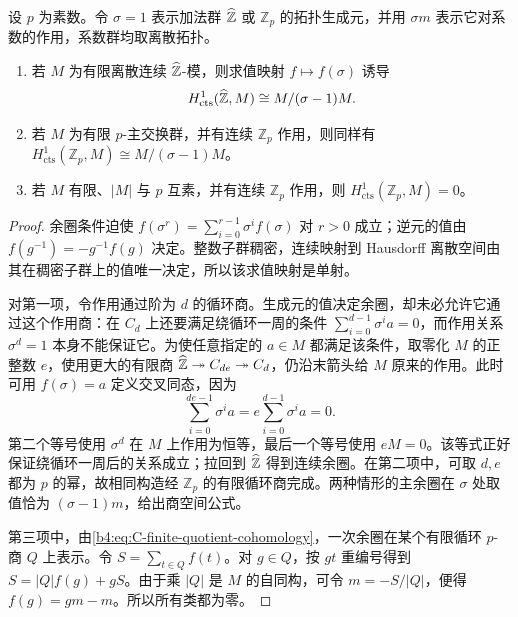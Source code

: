 \begin{proposition}\label{b4:prop:C-procyclic-h1}
	设 \(p\) 为素数。令 \(\sigma=1\) 表示加法群 \(\widehat{\vphantom{Z}\mathbb Z}\) 或 \(\mathbb Z_p\) 的拓扑生成元，并用 \(\sigma m\) 表示它对系数的作用，系数群均取离散拓扑。
	\begin{enumerate}
		\item 若 \(M\) 为有限离散连续 \(\widehat{\vphantom{Z}\mathbb Z}\)-模，则求值映射 \(f\mapsto f(\sigma)\) 诱导
			\[
				H^1_{\mathrm{cts}}(\widehat{\vphantom{Z}\mathbb Z},M) \cong M/(\sigma-1)M.
			\]
		\item 若 \(M\) 为有限 \(p\)-主交换群，并有连续 \(\mathbb Z_p\) 作用，则同样有 \(H^1_{\mathrm{cts}}(\mathbb Z_p,M)\cong M/(\sigma-1)M\)。
		\item 若 \(M\) 有限、\(|M|\) 与 \(p\) 互素，并有连续 \(\mathbb Z_p\) 作用，则 \(H^1_{\mathrm{cts}}(\mathbb Z_p,M)=0\)。
	\end{enumerate}
\end{proposition}
\begin{proof}
	余圈条件迫使 \(f(\sigma^r)=\sum_{i=0}^{r-1}\sigma^if(\sigma)\) 对 \(r>0\) 成立；逆元的值由 \(f(g^{-1})=-g^{-1}f(g)\) 决定。整数子群稠密，连续映射到 Hausdorff 离散空间由其在稠密子群上的值唯一决定，所以该求值映射是单射。

	对第一项，令作用通过阶为 \(d\) 的循环商。生成元的值决定余圈，却未必允许它通过这个作用商：在 \(C_d\) 上还要满足绕循环一周的条件 \(\sum_{i=0}^{d-1}\sigma^ia=0\)，而作用关系 \(\sigma^d=1\) 本身不能保证它。为使任意指定的 \(a\in M\) 都满足该条件，取零化 \(M\) 的正整数 \(e\)，使用更大的有限商 \(\widehat{\vphantom{Z}\mathbb Z}\twoheadrightarrow C_{de}\twoheadrightarrow C_d\)，仍沿末箭头给 \(M\) 原来的作用。此时可用 \(f(\sigma)=a\) 定义交叉同态，因为
	\[
		\sum_{i=0}^{de-1}\sigma^ia =e\sum_{i=0}^{d-1}\sigma^ia=0.
	\]
	第二个等号使用 \(\sigma^d\) 在 \(M\) 上作用为恒等，最后一个等号使用 \(eM=0\)。该等式正好保证绕循环一周后的关系成立；拉回到 \(\widehat{\vphantom{Z}\mathbb Z}\) 得到连续余圈。在第二项中，可取 \(d,e\) 都为 \(p\) 的幂，故相同构造经 \(\mathbb Z_p\) 的有限循环商完成。两种情形的主余圈在 \(\sigma\) 处取值恰为 \((\sigma-1)m\)，给出商空间公式。

	第三项中，由\eqref{b4:eq:C-finite-quotient-cohomology}，一次余圈在某个有限循环 \(p\)-商 \(Q\) 上表示。令 \(S=\sum_{t\in Q}f(t)\)。对 \(g\in Q\)，按 \(gt\) 重编号得到 \(S=|Q|f(g)+gS\)。由于乘 \(|Q|\) 是 \(M\) 的自同构，可令 \(m=-S/|Q|\)，便得 \(f(g)=gm-m\)。所以所有类都为零。
\end{proof}

